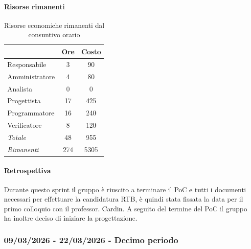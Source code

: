 \documentclass[a4paper,12pt]{article}
\begin{document}
            \paragraph{Risorse rimanenti}
                \begin{table}[H]
                \centering
                \caption{Risorse economiche rimanenti dal consuntivo orario}
                \begin{tabular}{|l|c|c|}
                \hline
                    \rowcolor{lightgray}{\textbf{Ruolo}} & {\textbf{Ore}} & {\textbf{Costo}}\\
                \hline
                    Responsabile & 3 & 90\\
                \hline
                    Amministratore & 4 & 80\\
                \hline
                    Analista & 0 & 0\\
                \hline
                    Progettista & 17 & 425\\
                \hline
                    Programmatore & 16 & 240\\
                \hline
                    Verificatore & 8 & 120\\
                \hline
                    \rowcolor{lightgray}\textit{Totale} & 48 & 955\\
                \hline
                    \rowcolor{lightgray}\textit{Rimanenti} & 274 & 5305\\
                \hline
                \end{tabular}
                \end{table}
                
            \paragraph{Retrospettiva}
            Durante questo sprint il gruppo è riuscito a terminare il PoC e tutti i documenti necessari per effettuare la candidatura RTB, è quindi stata fissata la data per il primo colloquio con il professor. Cardin. A seguito del termine del PoC il gruppo ha inoltre deciso di iniziare la progettazione.
       
            

        \subsubsection{09/03/2026 - 22/03/2026 - Decimo periodo}
\end{document}

